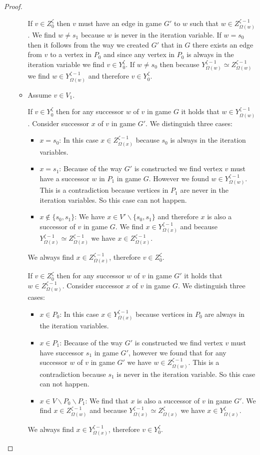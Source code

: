 \begin{theorem}
\begin{proof}
\begin{itemize}
\begin{itemize}
				If $v \in Z_0^{\zeta}$ then $v$ must have an edge in game $G'$ to $w$ such that $w\in Z^{\zeta-1}_{\Omega(w)}$. We find $w \neq s_1$ because $w$ is never in the iteration variable. If $w = s_0$ then it follows from the way we created $G'$ that in $G$ there exists an edge from $v$ to a vertex in $P_0$ and since any vertex in $P_0$ is always in the iteration variable we find $v \in Y_0^{\zeta}$. If $w \neq s_0$ then because $Y^{\zeta-1}_{\Omega(w)} \simeq Z^{\zeta-1}_{\Omega(w)}$ we find $w \in Y^{\zeta-1}_{\Omega(w)}$ and therefore $v \in Y_0^{\zeta}$.
				\item Assume $v \in V_1$.
				
				If $v \in Y_0^{\zeta}$ then for any successor $w$ of $v$ in game $G$ it holds that $w \in Y^{\zeta-1}_{\Omega(w)}$. Consider successor $x$ of $v$ in game $G'$. We distinguish three cases:
				\begin{itemize}
					\item $x = s_0$: In this case $x \in Z^{\zeta-1}_{\Omega(x)}$ because $s_0$ is always in the iteration variables.
					\item $x = s_1$: Because of the way $G'$ is constructed we find vertex $v$ must have a successor $w$ in $P_1$ in game $G$. However we found $w \in Y^{\zeta-1}_{\Omega(w)}$. This is a contradiction because vertices in $P_1$ are never in the iteration variables. So this case can not happen.
					\item $x \notin \{s_0,s_1\}$: We have $x \in V'\backslash \{s_0,s_1\}$ and therefore $x$ is also a successor of $v$ in game $G$. We find $x \in Y^{\zeta-1}_{\Omega(x)}$ and because $Y^{\zeta-1}_{\Omega(x)} \simeq Z^{\zeta-1}_{\Omega(x)}$ we have $x \in Z^{\zeta-1}_{\Omega(x)}$.
				\end{itemize}
				We always find  $x \in Z^{\zeta-1}_{\Omega(x)}$, therefore $v \in Z_0^{\zeta}$.
				
				If $v \in Z_0^{\zeta}$ then for any successor $w$ of $v$ in game $G'$ it holds that $w \in Z^{\zeta-1}_{\Omega(w)}$. Consider successor $x$ of $v$ in game $G$. We distinguish three cases:
				\begin{itemize}
					\item $x \in P_0$: In this case $x \in Y^{\zeta-1}_{\Omega(x)}$ because vertices in $P_0$ are always in the iteration variables.
					\item $x \in P_1$: Because of the way $G'$ is constructed we find vertex $v$ must have successor $s_1$ in game $G'$, however we found that for any successor $w$ of $v$ in game $G'$ we have $w \in Z^{\zeta-1}_{\Omega(w)}$. This is a contradiction because $s_1$ is never in the iteration variable. So this case can not happen.
					\item $x \in V \backslash P_0 \backslash P_1$: We find that $x$ is also a successor of $v$ in game $G'$. We find $x \in Z^{\zeta-1}_{\Omega(w)}$ and because $Y^{\zeta-1}_{\Omega(x)} \simeq Z^{\zeta}_{\Omega(x)}$ we have $x \in Y^{\zeta}_{\Omega(x)}$.
				\end{itemize}
				We always find  $x \in Y^{\zeta-1}_{\Omega(x)}$, therefore $v \in Y_0^{\zeta}$.
			\end{itemize}
			

\end{itemize}
\end{proof}
\end{theorem}
